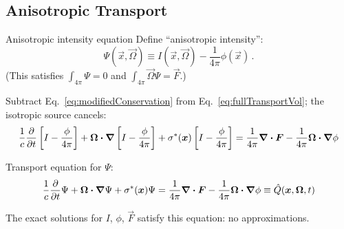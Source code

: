 \documentclass{beamer}
\begin{document}
\subsection{Anisotropic Transport}
\begin{frame}{Anisotropic intensity equation}
  Define ``anisotropic intensity'':
  \begin{equation} \label{eq:capPsi}
    \Psi(\vec{x}, \vec{\Omega}) \equiv I(\vec{x}, \vec{\Omega})
    - \frac{1}{4\pi} \phi(\vec{x})\,.
  \end{equation}
  (This satisfies $\int_{4\pi} \Psi=0$ and $\int_{4\pi} \vec{\Omega} \Psi =
  \vec{F}$.)

  Subtract Eq.~\eqref{eq:modifiedConservation} from
  Eq.~\eqref{eq:fullTransportVol}; the isotropic source cancels:
\begin{multline*}
  \frac{1}{c} \frac{\partial }{\partial t} \left[ I - \frac{\phi}{4\pi} \right]
    + \bm{\Omega}\bm{\cdot} \bm{\nabla} \left[ I - \frac{\phi}{4\pi} \right]
    + \sigma^\ast(\bm{x})\left[ I - \frac{\phi}{4\pi} \right]
  = \frac{1}{4\pi} \bm{\nabla} \bm{\cdot}\bm{F} -
  \frac{1}{4\pi} \bm{\Omega}\bm{\cdot} \bm{\nabla} \phi
\end{multline*}

  Transport equation for $\Psi$:
\begin{equation*}
  \frac{1}{c} \frac{\partial }{\partial t} \Psi
   + \bm{\Omega}\bm{\cdot} \bm{\nabla} \Psi
   + \sigma^\ast(\bm{x}) \Psi
  = \frac{1}{4\pi} \bm{\nabla} \bm{\cdot}\bm{F} -
  \frac{1}{4\pi} \bm{\Omega}\bm{\cdot} \bm{\nabla} \phi
  \equiv \hat Q(\bm{x}, \bm{\Omega}, t)
\end{equation*}

The exact solutions for $I$, $\phi$, $\vec{F}$ satisfy this equation: no
approximations.
\end{frame}
\end{document}
